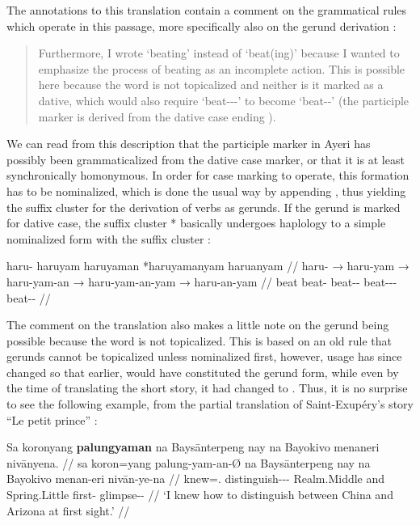 The annotations to this translation contain a comment on the grammatical 
rules which operate in this passage, more specifically also on the gerund 
derivation :

\blockcquote[14--15]{becker:kafka:imperial}{Furthermore, I wrote
 `beating' instead of  `beat(ing)' because I wanted to
emphasize the process of beating as an incomplete action. This is possible here
because the word is not topicalized and neither is it marked as a dative, which
would also require  `beat-\Ptcp{}-\Nmlz{}-\Dat{}' to become
 `beat-\Nmlz{}-\Dat{}' (the participle marker  is 
derived from the dative case ending ).}

We can read from this description that the participle marker in Ayeri has
possibly been grammaticalized from the dative case marker, or that it is at
least synchronically homonymous. In order for case marking to operate, this
formation has to be nominalized, which is done the usual way by appending
, thus yielding the suffix cluster  for the
derivation of verbs as gerunds. If the gerund is marked for dative case, the
suffix cluster * basically undergoes haplology to a
simple nominalized form with the suffix cluster :

\ex\begingl
	\gla haru- {} haruyam {} haruyaman {} *haruyamanyam {} haruanyam //
	\glb haru- → haru-yam → haru-yam-an → haru-yam-an-yam → 
		haru-an-yam //
	\glc beat {} beat-\Ptcp{} {} beat-\Ptcp{}-\Nmlz{} {} 
		beat-\Ptcp{}-\Nmlz{}-\Dat{} {} beat-\Nmlz{}-\Dat{} //
\endgl\xe

The comment on the translation also makes a little note on the gerund being
possible because the word is not topicalized. This is based on an old rule that
gerunds cannot be topicalized unless nominalized first, however, usage has
since changed so that earlier,  would have constituted
the gerund form, while even by the time of translating the short story, it had
changed to . Thus, it is no surprise to see the
following example, from the partial translation of Saint-Exupéry's story
\enquote{Le petit prince} \citep[3, 13]{benung:petitprince}:

\ex\label{ex:exuperygerund}\begingl
	\gla Sa koronyang \textbf{palungyaman} na Baysānterpeng nay na Bayokivo 
		menaneri nivānyena. //
	\glb sa koron=yang palung-yam-an-Ø na Baysānterpeng nay na 
		Bayokivo menan-eri nivān-ye-na //
	\glc \PatT{} knew=\Fsg{}.\Aarg{} 
		distinguish-\Ptcp{}-\Nmlz{}-\Top{} \Gen{} Realm.Middle 
		and \Gen{} Spring.Little first-\Ins{} glimpse-\Pl{}-\Gen{} //
	\glft `I knew how to distinguish between China and Arizona at first 
		sight.' //
\endgl\xe

